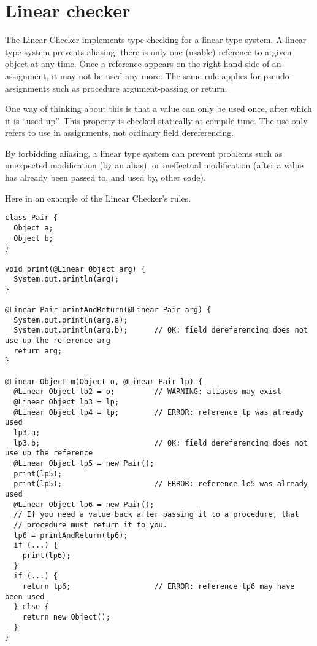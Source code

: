\htmlhr
\chapter{Linear checker\label{linear-checker}}

The Linear Checker implements type-checking for a linear type system.  A
linear type system prevents aliasing:  there is only one (usable) reference
to a given object at any time.  Once a reference appears on the right-hand
side of an assignment, it may not be used any more.  The same rule applies
for pseudo-assignments such as procedure argument-passing or return.

One way of thinking about this is that a value can only be used once, after
which it is ``used up''.  This property is checked statically at compile
time.  The use only refers to use in assignments, not ordinary field
dereferencing.

By forbidding aliasing, a linear type system can prevent problems such as
unexpected modification (by an alias), or ineffectual modification (after a
value has already been passed to, and used by, other code).






Here in an example of the Linear Checker's rules.

\begin{Verbatim}
class Pair {
  Object a;
  Object b;
}

void print(@Linear Object arg) {
  System.out.println(arg);
}

@Linear Pair printAndReturn(@Linear Pair arg) {
  System.out.println(arg.a);
  System.out.println(arg.b);      // OK: field dereferencing does not use up the reference arg
  return arg;
}

@Linear Object m(Object o, @Linear Pair lp) {
  @Linear Object lo2 = o;         // WARNING: aliases may exist
  @Linear Object lp3 = lp;          
  @Linear Object lp4 = lp;        // ERROR: reference lp was already used
  lp3.a;                            
  lp3.b;                          // OK: field dereferencing does not use up the reference
  @Linear Object lp5 = new Pair();
  print(lp5);      
  print(lp5);                     // ERROR: reference lo5 was already used
  @Linear Object lp6 = new Pair();
  // If you need a value back after passing it to a procedure, that
  // procedure must return it to you.
  lp6 = printAndReturn(lp6);
  if (...) {
    print(lp6);
  }
  if (...) {
    return lp6;                   // ERROR: reference lp6 may have been used
  } else {
    return new Object();
  }
}
\end{Verbatim}


